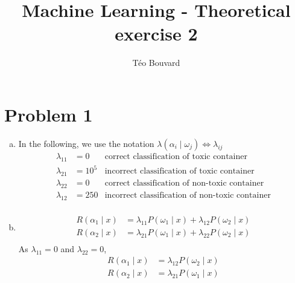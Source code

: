 \documentclass[a4paper, 10pt, twoside]{article}
\begin{document}
\title{Machine Learning - Theoretical exercise 2}
\author{T\'eo Bouvard}
\maketitle

\section*{Problem 1}
\begin{enumerate}[a)]
    \item In the following, we use the notation $\lambda(\alpha_i \mid \omega_j) \Leftrightarrow \lambda_{ij}$
          \begin{align*}
              \lambda_{11} & = 0    & \text{correct classification of toxic container}       \\
              \lambda_{21} & = 10^5 & \text{incorrect classification of toxic container}     \\
              \lambda_{22} & = 0    & \text{correct classification of non-toxic container}   \\
              \lambda_{12} & = 250  & \text{incorrect classification of non-toxic container} \\
          \end{align*}

    \item
          \begin{align*}
              R(\alpha_1 \mid x) & = \lambda_{11}P(\omega_1 \mid x) + \lambda_{12}P(\omega_2 \mid x) \\
              R(\alpha_2 \mid x) & = \lambda_{21}P(\omega_1 \mid x) + \lambda_{22}P(\omega_2 \mid x) \\
          \end{align*}
          As $\lambda_{11} = 0$ and $\lambda_{22} = 0$,
          \begin{align*}
              R(\alpha_1 \mid x) & = \lambda_{12}P(\omega_2 \mid x) \\
              R(\alpha_2 \mid x) & = \lambda_{21}P(\omega_1 \mid x) \\
          \end{align*}\label{eq:risk}


\end{enumerate}
\end{document}
